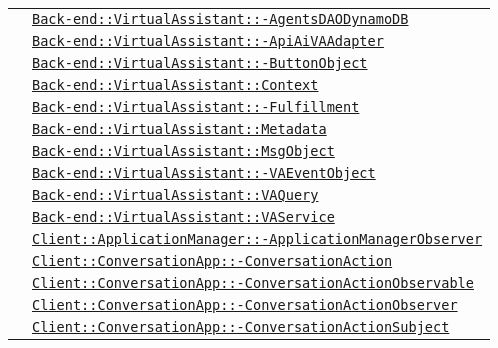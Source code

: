 \begin{longtable}{|>{\centering}m{3cm}|m{10cm}<{\centering}|}
& \hyperref[Back-end::VirtualAssistant::AgentsDAODynamoDB]{\texttt{Back-end::VirtualAssistant::-\linebreak AgentsDAODynamoDB}}\\
& \hyperref[Back-end::VirtualAssistant::ApiAiVAAdapter]{\texttt{Back-end::VirtualAssistant::-\linebreak ApiAiVAAdapter}}\\
& \hyperref[Back-end::VirtualAssistant::ButtonObject]{\texttt{Back-end::VirtualAssistant::-\linebreak ButtonObject}}\\
& \hyperref[Back-end::VirtualAssistant::Context]{\texttt{Back-end::VirtualAssistant::Context}}\\
& \hyperref[Back-end::VirtualAssistant::Fulfillment]{\texttt{Back-end::VirtualAssistant::-\linebreak Fulfillment}}\\
& \hyperref[Back-end::VirtualAssistant::Metadata]{\texttt{Back-end::VirtualAssistant::Metadata}}\\
& \hyperref[Back-end::VirtualAssistant::MsgObject]{\texttt{Back-end::VirtualAssistant::MsgObject}}\\
& \hyperref[Back-end::VirtualAssistant::VAEventObject]{\texttt{Back-end::VirtualAssistant::-\linebreak VAEventObject}}\\
& \hyperref[Back-end::VirtualAssistant::VAQuery]{\texttt{Back-end::VirtualAssistant::VAQuery}}\\
& \hyperref[Back-end::VirtualAssistant::VAService]{\texttt{Back-end::VirtualAssistant::VAService}}\\
& \hyperref[Client::ApplicationManager::ApplicationManagerObserver]{\texttt{Client::ApplicationManager::-\linebreak ApplicationManagerObserver}}\\
& \hyperref[Client::ConversationApp::ConversationAction]{\texttt{Client::ConversationApp::-\linebreak ConversationAction}}\\
& \hyperref[Client::ConversationApp::ConversationActionObservable]{\texttt{Client::ConversationApp::-\linebreak ConversationActionObservable}}\\
& \hyperref[Client::ConversationApp::ConversationActionObserver]{\texttt{Client::ConversationApp::-\linebreak ConversationActionObserver}}\\
& \hyperref[Client::ConversationApp::ConversationActionSubject]{\texttt{Client::ConversationApp::-\linebreak ConversationActionSubject}}\\

\end{longtable}
